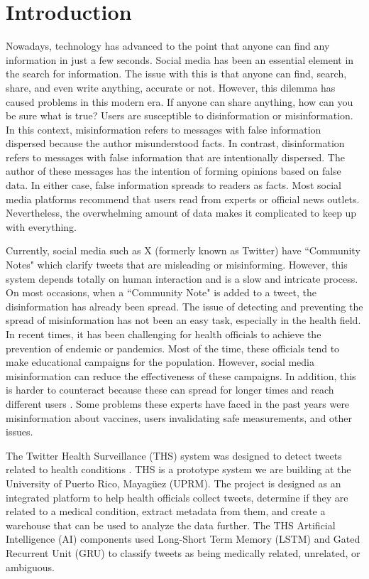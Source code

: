 
\section{Introduction}
\noindent Nowadays, technology has advanced to the point that anyone can find any information in just a few seconds. Social media has been an essential
element in the search for information. The issue with this is that anyone can find, search, share, and even write anything, accurate or not. However, this dilemma
has caused problems in this modern era. If anyone can share anything, how can you be sure what is true? Users are susceptible to disinformation or misinformation.
In this context, misinformation refers to messages with false information dispersed because the author misunderstood facts. In contrast, disinformation refers to
messages with false information that are intentionally dispersed. The author of these messages has the intention of forming opinions based on false data. In either
case, false information spreads to readers as facts. Most social media platforms recommend that users read from experts or official news outlets. Nevertheless,
the overwhelming amount of data makes it complicated to keep up with everything.

Currently, social media such as X (formerly known as Twitter) have ``Community Notes" which clarify tweets that are misleading or misinforming. However, this system
depends totally on human interaction and is a slow and intricate process. On most occasions, when a ``Community Note" is added to a tweet, the disinformation has
already been spread. The issue of detecting and preventing the spread of misinformation has not been an easy task, especially in the health field.  In recent times, it has
been challenging for health officials to achieve the prevention of endemic or pandemics. Most of the time, these officials tend to make educational
campaigns for the population. However, social media misinformation can reduce the effectiveness of these campaigns. In addition, this is harder to counteract because
these can spread for longer times and reach different users \cite{article}. Some problems these experts have faced in the past years were misinformation
about vaccines, users invalidating safe measurements, and other issues.

The Twitter Health Surveillance (THS) system was designed to detect tweets related to health conditions \cite{8622504}. THS is a prototype system we are building at the University
of Puerto Rico, Mayag\"uez (UPRM). The project is designed as an integrated platform to help health officials collect tweets, determine if they are related to a medical condition, extract
metadata from them, and create a warehouse that can be used to analyze the data further. The THS Artificial Intelligence (AI) components used Long-Short Term Memory (LSTM)
and Gated Recurrent Unit (GRU) to classify tweets as being medically related, unrelated, or ambiguous. 

